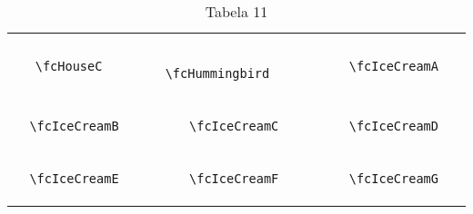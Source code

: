 \documentclass[x11names]{article}
\begin{document}
\begin{table}[H]
\begin{tabular}{|c|c|c|c|c|c|}
		&\multirow{5}{*}{	\fcHouseC	[scale=0.4]} & &\multirow{5}{*}{	\fcHummingbird	[scale=0.4]} & &\multirow{5}{*}{	\fcIceCreamA	[scale=0.4]}\\	& & & & & \\	& & & & & \\	\verb|	\fcHouseC	| & & \verb|	\fcHummingbird	| & & \verb|	\fcIceCreamA	| & \\	& & & & & \\	& & & & & \\	& & & & & \\	\hline									
		&\multirow{5}{*}{	\fcIceCreamB	[scale=0.4]} & &\multirow{5}{*}{	\fcIceCreamC	[scale=0.3]} & &\multirow{5}{*}{	\fcIceCreamD	[scale=0.3]}\\	& & & & & \\	& & & & & \\	\verb|	\fcIceCreamB	| & & \verb|	\fcIceCreamC	| & & \verb|	\fcIceCreamD	| & \\	& & & & & \\	& & & & & \\	& & & & & \\	\hline									
		&\multirow{5}{*}{	\fcIceCreamE	[scale=0.4]} & &\multirow{5}{*}{	\fcIceCreamF	[scale=0.4]} & &\multirow{5}{*}{	\fcIceCreamG	[scale=0.4]}\\	& & & & & \\	& & & & & \\	\verb|	\fcIceCreamE	| & & \verb|	\fcIceCreamF	| & & \verb|	\fcIceCreamG	| & \\	& & & & & \\	& & & & & \\	& & & & & \\		\hline 	\hline 	\end{tabular}	\caption{	Tabela 11	}\label{	Tab11	}\end{table}
\end{document}
